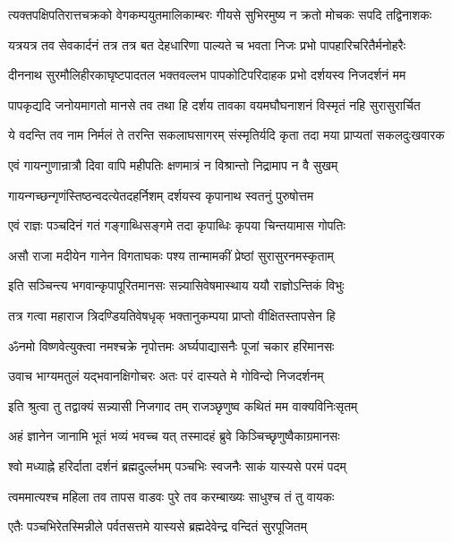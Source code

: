 \twolineshloka
{त्यक्तपक्षिपतिरात्तचक्रको वेगकम्पयुतमालिकाम्बरः}
{गीयसे सुभिरमुष्य न क्रतो मोचकः सपदि तद्विनाशकः}%

\twolineshloka
{यत्रयत्र तव सेवकार्दनं तत्र तत्र बत देहधारिणा}
{पाल्यते च भवता निजः प्रभो पापहारिचरितैर्मनोहरैः}%

\twolineshloka
{दीननाथ सुरमौलिहीरकाघृष्टपादतल भक्तवल्लभ}
{पापकोटिपरिदाहक प्रभो दर्शयस्व निजदर्शनं मम}%

\twolineshloka
{पापकृद्यदि जनोयमागतो मानसे तव तथा हि दर्शय}
{तावका वयमघौघनाशनं विस्मृतं नहि सुरासुरार्चित}%

\twolineshloka
{ये वदन्ति तव नाम निर्मलं ते तरन्ति सकलाघसागरम्}
{संस्मृतिर्यदि कृता तदा मया प्राप्यतां सकलदुःखवारक}%


\twolineshloka
{एवं गायन्गुणान्रात्रौ दिवा वापि महीपतिः}
{क्षणमात्रं न विश्रान्तो निद्रामाप न वै सुखम्}%

\twolineshloka
{गायन्गच्छन्गृणंस्तिष्ठन्वदत्येतदहर्निशम्}
{दर्शयस्व कृपानाथ स्वतनुं पुरुषोत्तम}%

\twolineshloka
{एवं राज्ञः पञ्चदिनं गतं गङ्गाब्धिसङ्गमे}
{तदा कृपाब्धिः कृपया चिन्तयामास गोपतिः}%

\twolineshloka
{असौ राजा मदीयेन गानेन विगताघकः}
{पश्य तान्मामकीं प्रेष्ठां सुरासुरनमस्कृताम्}%

\twolineshloka
{इति सञ्चिन्त्य भगवान्कृपापूरितमानसः}
{सन्न्यासिवेषमास्थाय ययौ राज्ञोऽन्तिकं विभुः}%

\twolineshloka
{तत्र गत्वा महाराज त्रिदण्डियतिवेषधृक्}
{भक्तानुकम्पया प्राप्तो वीक्षितस्तापसेन हि}%

\twolineshloka
{ॐनमो विष्णवेत्युक्त्वा नमश्चक्रे नृपोत्तमः}
{अर्घ्यपाद्यासनैः पूजां चकार हरिमानसः}%

\twolineshloka
{उवाच भाग्यमतुलं यद्भवानक्षिगोचरः}
{अतः परं दास्यते मे गोविन्दो निजदर्शनम्}%

\twolineshloka
{इति श्रुत्वा तु तद्वाक्यं सन्न्यासी निजगाद तम्}
{राजञ्छृणुष्व कथितं मम वाक्यविनिःसृतम्}%

\twolineshloka
{अहं ज्ञानेन जानामि भूतं भव्यं भवच्च यत्}
{तस्मादहं ब्रुवे किञ्चिच्छृणुष्वैकाग्रमानसः}%

\twolineshloka
{श्वो मध्याह्ने हरिर्दाता दर्शनं ब्रह्मदुर्ल्लभम्}
{पञ्चभिः स्वजनैः साकं यास्यसे परमं पदम्}%

\twolineshloka
{त्वममात्यश्च महिला तव तापस वाडवः}
{पुरे तव करम्बाख्यः साधुश्च तं तु वायकः}%

\twolineshloka
{एतैः पञ्चभिरेतस्मिन्नीले पर्वतसत्तमे}
{यास्यसे ब्रह्मदेवेन्द्र वन्दितं सुरपूजितम्}%

